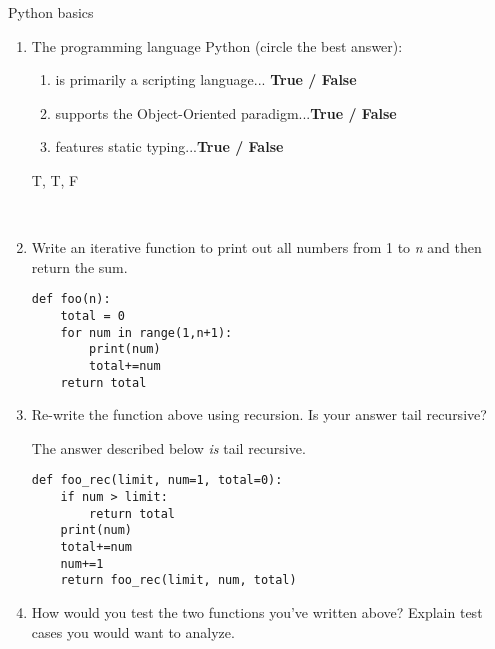 Python basics
\begin{enumerate}
\item The programming language Python (circle the best answer):\\
\begin{enumerate}
\item is primarily a scripting language...	\hspace{40mm}\textbf{True / False}\\
\item supports the Object-Oriented paradigm...\hspace{30mm}\textbf{True / False}\\
\item features static typing...\hspace{61mm}\textbf{True / False}\\
\end{enumerate}
\begin{answer}
T, T, F
\end{answer}
\\
\item Write an iterative function to print out all numbers from 1 to \emph{n} and then return the sum.

\begin{answer}
\begin{lstlisting}
def foo(n):
	total = 0
	for num in range(1,n+1):
		print(num)
		total+=num
	return total
\end{lstlisting}
\end{answer}

\item Re-write the function above using recursion. Is your answer tail recursive?

\begin{answer}
The answer described below \emph{is} tail recursive.
\begin{lstlisting}
def foo_rec(limit, num=1, total=0):
	if num > limit:
		return total
	print(num)
	total+=num
	num+=1
	return foo_rec(limit, num, total)
\end{lstlisting}
\end{answer}

\item How would you test the two functions you've written above? Explain test cases you would want to analyze.


\end{enumerate}
